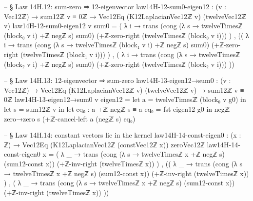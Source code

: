 \documentclass[11pt,a4paper]{book}
\begin{document}
\begin{code}
  -- § Law 14H.12: sum-zero ⇒ 12-eigenvector
  law14H-12-sum0-eigen12 : (v : Vec12ℤ) → sum12ℤ v ≡ 0ℤ → Vec12Eq (K12LaplacianVec12ℤ v) (twelveVec12ℤ v)
  law14H-12-sum0-eigen12 v sum0 =
    ( λ i →
        trans
          (cong (λ s → twelveTimesℤ (block₀ v i) +ℤ negℤ s) sum0)
          (+ℤ-zero-right (twelveTimesℤ (block₀ v i)))
    ) ,
    (( λ i →
          trans
            (cong (λ s → twelveTimesℤ (block₁ v i) +ℤ negℤ s) sum0)
            (+ℤ-zero-right (twelveTimesℤ (block₁ v i)))
      ) ,
     ( λ i →
          trans
            (cong (λ s → twelveTimesℤ (block₂ v i) +ℤ negℤ s) sum0)
            (+ℤ-zero-right (twelveTimesℤ (block₂ v i)))
      ))

  -- § Law 14H.13: 12-eigenvector ⇒ sum-zero
  law14H-13-eigen12→sum0 : (v : Vec12ℤ) → Vec12Eq (K12LaplacianVec12ℤ v) (twelveVec12ℤ v) → sum12ℤ v ≡ 0ℤ
  law14H-13-eigen12→sum0 v eigen12 =
    let a = twelveTimesℤ (block₀ v g0) in
    let s = sum12ℤ v in
    let eq₀ : a +ℤ negℤ s ≡ a
        eq₀ = fst eigen12 g0
    in
    negℤ-zero→zero s (+ℤ-cancel-left a (negℤ s) eq₀)

  -- § Law 14H.14: constant vectors lie in the kernel
  law14H-14-const-eigen0 : (x : ℤ) → Vec12Eq (K12LaplacianVec12ℤ (constVec12ℤ x)) zeroVec12ℤ
  law14H-14-const-eigen0 x =
    ( λ _ →
        trans
          (cong (λ s → twelveTimesℤ x +ℤ negℤ s) (sum12-const x))
          (+ℤ-inv-right (twelveTimesℤ x))
    ) ,
    (( λ _ →
          trans
            (cong (λ s → twelveTimesℤ x +ℤ negℤ s) (sum12-const x))
            (+ℤ-inv-right (twelveTimesℤ x))
      ) ,
     ( λ _ →
          trans
            (cong (λ s → twelveTimesℤ x +ℤ negℤ s) (sum12-const x))
            (+ℤ-inv-right (twelveTimesℤ x))
      ))


\end{code}
\end{document}
